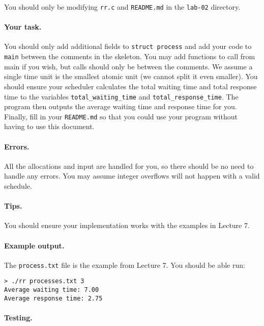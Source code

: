 You should only be modifying \texttt{rr.c} and \texttt{README.md} in the
\texttt{lab-02} directory.

\paragraph{Your task.}

You should only add additional fields to \texttt{struct process} and add your
code to \texttt{main} between the comments in the skeleton. You may add
functions to call from main if you wish, but calls should only be between the
comments. We assume a single time unit is the smallest atomic unit (we cannot
split it even smaller).
You should ensure your scheduler calculates the total waiting time and total
response time to the variables \texttt{total\_waiting\_time} and
\texttt{total\_response\_time}.
The program then outputs the average waiting time and response time for you.
Finally, fill in your \texttt{README.md} so that you could use your program
without having to use this document.

\paragraph{Errors.}

All the allocations and input are handled for you, so there should be no need to
handle any errors.
You may assume integer overflows will not happen with a valid schedule.

\paragraph{Tips.}

You should ensure your implementation works with the examples in Lecture 7.

\paragraph{Example output.}

The \texttt{process.txt} file is the example from Lecture 7. You should be able
run:

\begin{lstlisting}
> ./rr processes.txt 3
Average waiting time: 7.00             
Average response time: 2.75
\end{lstlisting}

\paragraph{Testing.}

